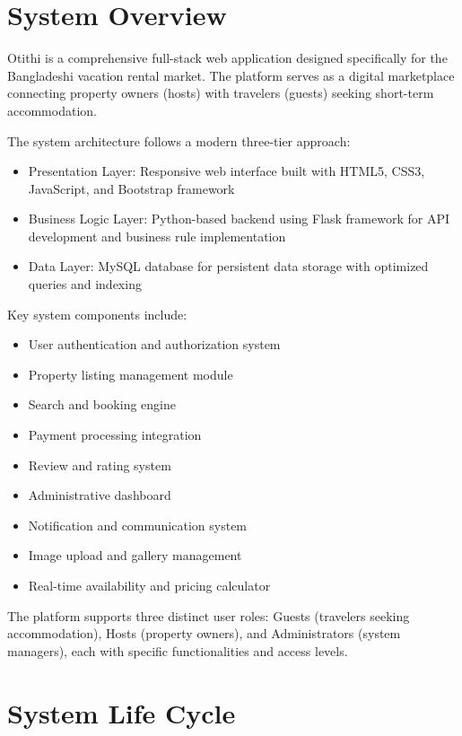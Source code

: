 \documentclass[12pt,a4paper]{report}
\begin{document}
\chapter{System Overview}

Otithi is a comprehensive full-stack web application designed specifically for the Bangladeshi vacation rental market. The platform serves as a digital marketplace connecting property owners (hosts) with travelers (guests) seeking short-term accommodation.

The system architecture follows a modern three-tier approach:
\begin{itemize}
    \item Presentation Layer: Responsive web interface built with HTML5, CSS3, JavaScript, and Bootstrap framework
    \item Business Logic Layer: Python-based backend using Flask framework for API development and business rule implementation
    \item Data Layer: MySQL database for persistent data storage with optimized queries and indexing
\end{itemize}

Key system components include:
\begin{itemize}
    \item User authentication and authorization system
    \item Property listing management module
    \item Search and booking engine
    \item Payment processing integration
    \item Review and rating system
    \item Administrative dashboard
    \item Notification and communication system
    \item Image upload and gallery management
    \item Real-time availability and pricing calculator
\end{itemize}

The platform supports three distinct user roles: Guests (travelers seeking accommodation), Hosts (property owners), and Administrators (system managers), each with specific functionalities and access levels.

\chapter{System Life Cycle}
\end{document}
